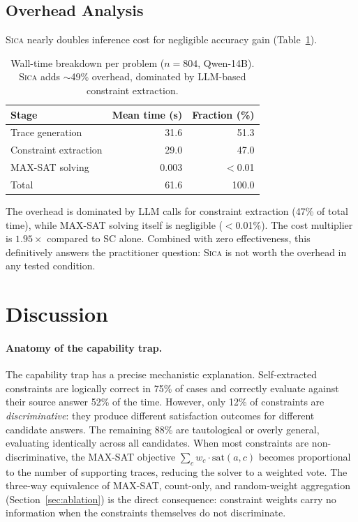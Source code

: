 \documentclass[11pt,a4paper]{article}
\newcommand{\sica}{\textsc{Sica}}
\begin{document}
\subsection{Overhead Analysis}
\label{sec:overhead}

\sica{} nearly doubles inference cost for negligible accuracy gain (Table~\ref{tab:overhead}).

\begin{table}[t]
\centering
\caption{Wall-time breakdown per problem ($n=804$, Qwen-14B). \sica{} adds $\sim$49\% overhead, dominated by LLM-based constraint extraction.}
\label{tab:overhead}
\small
\begin{tabular}{lrr}
\toprule
\textbf{Stage} & \textbf{Mean time (s)} & \textbf{Fraction (\%)} \\
\midrule
Trace generation & 31.6 & 51.3 \\
Constraint extraction & 29.0 & 47.0 \\
MAX-SAT solving & 0.003 & $<$0.01 \\
\midrule
Total & 61.6 & 100.0 \\
\bottomrule
\end{tabular}
\end{table}

The overhead is dominated by LLM calls for constraint extraction (47\% of total time), while MAX-SAT solving itself is negligible ($<$0.01\%).
The cost multiplier is $1.95\times$ compared to SC alone.
Combined with zero effectiveness, this definitively answers the practitioner question: \sica{} is not worth the overhead in any tested condition.

\section{Discussion}
\label{sec:discussion}

\paragraph{Anatomy of the capability trap.}
The capability trap has a precise mechanistic explanation.
Self-extracted constraints are logically correct in 75\% of cases and correctly evaluate against their source answer 52\% of the time.
However, only 12\% of constraints are \emph{discriminative}: they produce different satisfaction outcomes for different candidate answers.
The remaining 88\% are tautological or overly general, evaluating identically across all candidates.
When most constraints are non-discriminative, the MAX-SAT objective $\sum_c w_c \cdot \text{sat}(a, c)$ becomes proportional to the number of supporting traces, reducing the solver to a weighted vote.
The three-way equivalence of MAX-SAT, count-only, and random-weight aggregation (Section~\ref{sec:ablation}) is the direct consequence: constraint weights carry no information when the constraints themselves do not discriminate.
\end{document}
